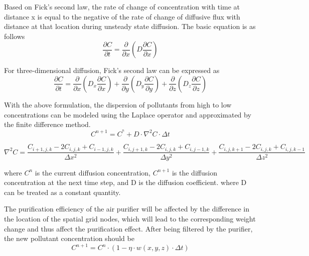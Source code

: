 \documentclass{apmcmthesis}
\begin{document}
Based on Fick's second law, the rate of change of concentration with time at distance x is equal to the negative of the rate of change of diffusive flux with distance at that location during unsteady state diffusion. The basic equation is as follows
\begin{equation}
	\frac{{\partial C}}{{\partial t}} = \frac{\partial }{{\partial x}}\left( {D\frac{{\partial C}}{{\partial x}}} \right)
\end{equation}

For three-dimensional diffusion, Fick's second law can be expressed as
\begin{equation}
	\frac{{\partial C}}{{\partial t}} = \frac{\partial }{{\partial x}}\left( {{D_x}\frac{{\partial C}}{{\partial x}}} \right) + \frac{\partial }{{\partial y}}\left( {{D_y}\frac{{\partial C}}{{\partial y}}} \right) + \frac{\partial }{{\partial z}}\left( {{D_z}\frac{{\partial C}}{{\partial z}}} \right)
\end{equation}

With the above formulation, the dispersion of pollutants from high to low concentrations can be modeled using the Laplace operator and approximated by the finite difference method.
\begin{equation}
	{C^{n + 1}} = {C^{^n}} + D \cdot {\nabla ^2}C \cdot \Delta t
\end{equation}

\begin{equation}
	{\nabla ^2}C = \frac{{C_{i + 1,j,k}^{} - 2C_{i,j,k}^{} + C_{i - 1,j,k}^{}}}{{\Delta {x^2}}} + \frac{{C_{i,j + 1,k}^{} - 2C_{i,j,k}^{} + C_{i,j - 1,k}^{}}}{{\Delta {y^2}}} + \frac{{C_{i,j,k + 1}^{} - 2C_{i,j,k}^{} + C_{i,j,k - 1}^{}}}{{\Delta {z^2}}}
\end{equation}

where ${C^n}$ is the current diffusion concentration, ${C^{n + 1}}$ is the diffusion concentration at the next time step, and D is the diffusion coefficient. where D can be treated as a constant quantity.

The purification efficiency of the air purifier will be affected by the difference in the location of the spatial grid nodes, which will lead to the corresponding weight change and thus affect the purification effect. After being filtered by the purifier, the new pollutant concentration should be
\begin{equation}
{C^{n + 1}} = {C^n} \cdot \left( {1 - \eta  \cdot w\left( {x,y,z} \right) \cdot \Delta t} \right)
\end{equation}
\end{document}
